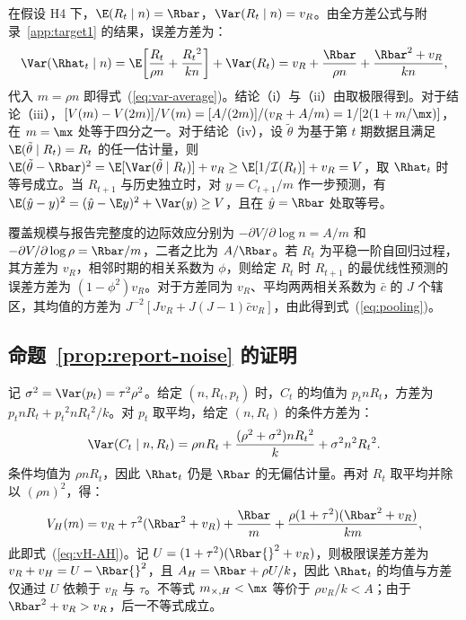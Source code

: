 在假设 H4 下，$\E(R_t\mid n)=\Rbar$，$\Var(R_t\mid n)=v_R$。由全方差公式与附录~\ref{app:target1} 的结果，误差方差为：
\begin{equation}
  \Var(\Rhat_t\mid n)=\E\!\left[\frac{R_t}{\rho n}+\frac{R_t{}^2}{kn}\right]+\Var(R_t)=v_R+\frac{\Rbar}{\rho n}+\frac{\Rbar^2+v_R}{kn},
\end{equation}
代入 $m=\rho n$ 即得式~(\ref{eq:var-average})。结论（i）与（ii）由取极限得到。对于结论（iii），$[V(m)-V(2m)]/V(m)=[A/(2m)]/(v_R+A/m)=1/[2(1+m/\mx)]$，在 $m=\mx$ 处等于四分之一。对于结论（iv），设 $\tilde{\theta}$ 为基于第 $t$ 期数据且满足 $\E(\tilde{\theta}\mid R_t)=R_t$ 的任一估计量，则 $\E(\tilde{\theta}-\Rbar)^2=\E[\Var(\tilde{\theta}\mid R_t)]+v_R\ge\E[1/\mathcal{I}(R_t)]+v_R=V$，取 $\Rhat_t$ 时等号成立。当 $R_{t+1}$ 与历史独立时，对 $y=C_{t+1}/m$ 作一步预测，有 $\E(\hat{y}-y)^2=(\hat{y}-\E y)^2+\Var(y)\ge V$，且在 $\hat{y}=\Rbar$ 处取等号。

覆盖规模与报告完整度的边际效应分别为 $-\partial V/\partial\log n=A/m$ 和 $-\partial V/\partial\log\rho=\Rbar/m$，二者之比为 $A/\Rbar$。若 $R_t$ 为平稳一阶自回归过程，其方差为 $v_R$，相邻时期的相关系数为 $\phi$，则给定 $R_t$ 时 $R_{t+1}$ 的最优线性预测的误差方差为 $(1-\phi^2)v_R$\citep{hamilton1994time}。对于方差同为 $v_R$、平均两两相关系数为 $\bar{c}$ 的 $J$ 个辖区，其均值的方差为 $J^{-2}[Jv_R+J(J-1)\bar{c}v_R]$，由此得到式~(\ref{eq:pooling})。

\subsection{命题~\ref{prop:report-noise} 的证明}
\label{app:prop2}

记 $\sigma^2=\Var(p_t)=\tau^2\rho^2$。给定 $(n,R_t,p_t)$ 时，$C_t$ 的均值为 $p_tnR_t$，方差为 $p_tnR_t+p_t{}^2nR_t{}^2/k$。对 $p_t$ 取平均，给定 $(n,R_t)$ 的条件方差为：
\begin{equation}
  \Var(C_t\mid n,R_t)=\rho nR_t+\frac{(\rho^2+\sigma^2)nR_t{}^2}{k}+\sigma^2n^2R_t{}^2.
\end{equation}
条件均值为 $\rho nR_t$，因此 $\Rhat_t$ 仍是 $\Rbar$ 的无偏估计量。再对 $R_t$ 取平均并除以 $(\rho n)^2$，得：
\begin{equation}
  V_H(m)=v_R+\tau^2(\Rbar^2+v_R)+\frac{\Rbar}{m}+\frac{\rho(1+\tau^2)(\Rbar^2+v_R)}{km},
\end{equation}
此即式~(\ref{eq:vH-AH})。记 $U=(1+\tau^2)(\Rbar{}^2+v_R)$，则极限误差方差为 $v_R+v_H=U-\Rbar{}^2$，且 $A_H=\Rbar+\rho U/k$，因此 $\Rhat_t$ 的均值与方差仅通过 $U$ 依赖于 $v_R$ 与 $\tau$。不等式 $m_{\times,H}<\mx$ 等价于 $\rho v_R/k<A$；由于 $\Rbar^2+v_R>v_R$，后一不等式成立。

